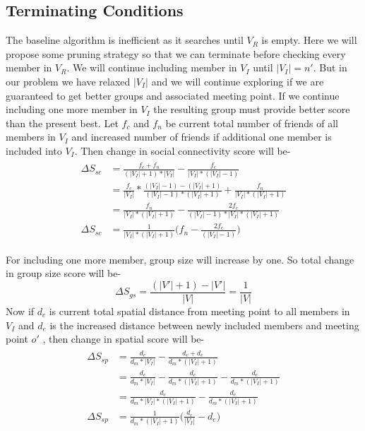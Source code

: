 \documentclass{vldb}
\begin{document}
		
		 
		\subsection{Terminating Conditions}	
		
		The baseline algorithm is inefficient as it searches until $ V_R $ is empty. Here we will propose some pruning strategy so that we can terminate before checking every member in $ V_R $.  
		We will continue including member in $ V_I $ until $ |V_I|=n' $. But in our problem we have relaxed $ |V_I| $ and we will continue exploring if we are guaranteed to get better groups and associated meeting point. If we continue including one more member in $ V_I $ the resulting group must provide better score than the present best. Let $ f_{c} $ and $ f_{n} $ be current total number of friends of all members in $ V_I $ and increased number of friends if additional one member is  included into $  V_I $. Then change in social connectivity score will be-
		\begin{equation*}
		\begin{split}
		\begin{aligned}
			\Delta   S_{sc}&=\frac{f_{c}+f_{n}}{(|V_I|+1)*|V_I|}-\frac{f_{c}}{|V_I|*(|V_I|-1)}
			\\
			&=\frac{f_c}{|V_I|}*\frac{(|V_I|-1)-(|V_I|+1)}{(|V_I|-1)*(|V_I|+1)}+\frac{f_n}{|V_I|*(|V_I|+1)}
			\\
			&=\frac{f_n}{|V_I|*(|V_I|+1)}-\frac{2f_c}{(|V_I|-1)*|V_I|*(|V_I|+1)}
			\\
			\Delta S_{sc}&=\frac{1}{|V_I|*(|V_I|+1)}\bigg(f_n-\frac{2f_c}{(|V_I|-1)}
			\bigg)
			\end{aligned}	
		\end{split}
		\end{equation*}
		
		
		For including one more member, group size will increase by one. So total change in group size score will be-
		\[
		\Delta S_{gs} = \frac{(|V'|+1)-|V'|}{|V|}=\frac{1}{|V|}
		\] 
		Now if $ d_c $ is current total spatial distance from meeting point to all members in $ V_I $ and $ d_{e} $ is the increased distance between newly included members and meeting point $ o' $ , then change in spatial score will be-
		\[
		\begin{split}
		\begin{aligned}
			\Delta S_{sp}&=\frac{d_{c}}{d_{m}*|V_I|}-\frac{d_{c}+d_{e}}{d_{m}*(|V_I|+1)}
		\\
		&=\frac{d_c}{d_m*|V_I|}-\frac{d_c}{d_m*(|V_I|+1)}-\frac{d_e}{d_m*(|V_I|+1)}
		\\
		&= \frac{d_c}{d_m*|V_I|*(|V_I|+1)}-\frac{d_e}{d_m*(|V_I|+1)}
		\\
		\Delta S_{sp}&=\frac{1}{d_m*(|V_I|+1)}\bigg(\frac{d_c}{|V_I|}-d_e\bigg)
		\end{aligned}
		\end{split}
	 	\]
		
\end{document}
